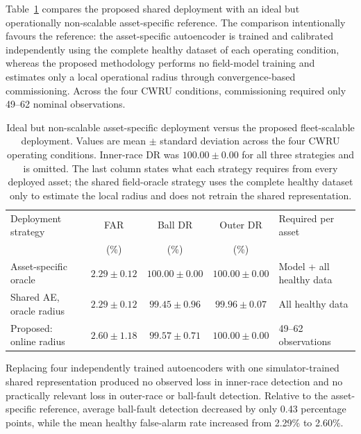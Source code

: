\documentclass[numbered]{trbunofficial}
\begin{document}
Table~\ref{tab:oracle-vs-proposed} compares the proposed shared deployment
with an ideal but operationally non-scalable asset-specific reference. The
comparison intentionally favours the reference: the asset-specific
autoencoder is trained and calibrated independently using the complete
healthy dataset of each operating condition, whereas the proposed
methodology performs no field-model training and estimates only a local
operational radius through convergence-based commissioning. Across the four
CWRU conditions, commissioning required only 49--62 nominal observations.

\begin{table}[!ht]
\centering
\caption{Ideal but non-scalable asset-specific deployment versus the proposed
fleet-scalable deployment. Values are mean $\pm$ standard deviation across
the four CWRU operating conditions. Inner-race DR was $100.00 \pm 0.00$ for
all three strategies and is omitted. The last column states what each strategy
requires from every deployed asset; the shared field-oracle strategy uses the
complete healthy dataset only to estimate the local radius and does not
retrain the shared representation.}
\label{tab:oracle-vs-proposed}
\setlength{\tabcolsep}{4pt}
\begin{tabular}{@{}lcccl@{}}
\toprule
Deployment strategy & FAR & Ball DR & Outer DR & Required per asset \\
                    & (\%) & (\%)   & (\%)     &                    \\
\midrule

Asset-specific oracle
& $2.29 \pm 0.12$ & $100.00 \pm 0.00$ & $100.00 \pm 0.00$
& Model + all healthy data \\

Shared AE, oracle radius
& $2.29 \pm 0.12$ & $99.45 \pm 0.96$ & $99.96 \pm 0.07$
& All healthy data \\

Proposed: online radius
& $2.60 \pm 1.18$ & $99.57 \pm 0.71$ & $100.00 \pm 0.00$
& 49--62 observations \\

\bottomrule
\end{tabular}
\end{table}

Replacing four independently trained autoencoders with one
simulator-trained shared representation produced no observed loss in
inner-race detection and no practically relevant loss in outer-race or
ball-fault detection. Relative to the asset-specific reference, average
ball-fault detection decreased by only 0.43 percentage points, while the
mean healthy false-alarm rate increased from 2.29\% to 2.60\%.
\end{document}
